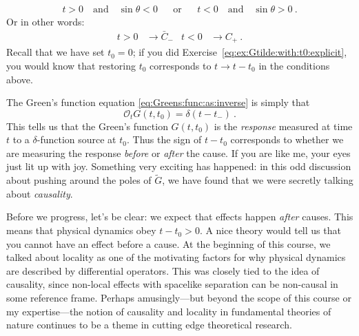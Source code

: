 \documentclass[
  11pt,
	colorful,
	raggedright,
]{tufte-style-thesis-flip}
\begin{document}
\begin{align}
  t > 0 \quad\text{and}\quad \sin\theta < 0 &
  &\text{or}&&
  t < 0 \quad\text{and}\quad \sin\theta > 0 \ .
  \label{eq:t:gtr:less:upper:poles}
\end{align}
Or in other words:
\begin{align}
  t>0 &\to \bar C_{-} 
  &
  t<0 &\to C_+ \ .
  \label{eq:t:sign:contour:HO}
\end{align}
Recall that we have set $t_0 = 0$; if you did Exercise~\ref{eq:ex:Gtilde:with:t0:explicit}, you would know that restoring $t_0$ corresponds to $t\to t-t_0$ in the conditions above.

The Green's function equation \eqref{eq:Greens:func:as:inverse} is simply that $$\mathcal O_t G(t,t_0) = \delta(t-t_-)\ .$$ This tells us that the Green's function $G(t,t_0)$ is the \emph{response} measured at time $t$ to a $\delta$-function source at $t_0$. Thus the sign of $t-t_0$ corresponds to whether we are measuring the response \emph{before} or \emph{after} the cause. If you are like me, your eyes just lit up with joy. Something very exciting has happened: in this odd discussion about pushing around the poles of $\tilde G$, we have found that we were secretly talking about \emph{causality}.  

Before we progress, let's be clear: we expect that effects happen \emph{after} causes. This means that physical dynamics obey $t-t_0 >0$. A nice theory would tell us that you cannot have an effect before a cause. At the beginning of this course, we talked about locality as one of the motivating factors for why physical dynamics are described by differential operators. This was closely tied to the idea of causality, since non-local effects with spacelike separation can be non-causal in some reference frame. Perhaps amusingly---but beyond the scope of this course or my expertise---the notion of causality and locality in fundamental theories of nature continues to be a theme in cutting edge theoretical research. 
\end{document}
